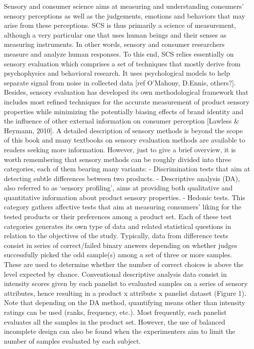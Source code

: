\documentclass[
]{book}
\begin{document}
Sensory and consumer science aims at measuring and understanding consumers' sensory perceptions as well as the judgements, emotions and behaviors that may arise from these perceptions. SCS is thus primarily a science of measurement, although a very particular one that uses human beings and their senses as measuring instruments. In other words, sensory and consumer researchers measure and analyze human responses.
To this end, SCS relies essentially on sensory evaluation which comprises a set of techniques that mostly derive from psychophysics and behavioral research. It uses psychological models to help separate signal from noise in collected data {[}ref O'Mahony, D.Ennis, others?{]}. Besides, sensory evaluation has developed its own methodological framework that includes most refined techniques for the accurate measurement of product sensory properties while minimizing the potentially biasing effects of brand identity and the influence of other external information on consumer perception {[}Lawless \& Heymann, 2010{]}.
A detailed description of sensory methods is beyond the scope of this book and many textbooks on sensory evaluation methods are available to readers seeking more information. However, just to give a brief overview, it is worth remembering that sensory methods can be roughly divided into three categories, each of them bearing many variants:
- Discrimination tests that aim at detecting subtle differences between two products.
- Descriptive analysis (DA), also referred to as `sensory profiling', aims at providing both qualitative and quantitative information about product sensory properties.
- Hedonic tests. This category gathers affective tests that aim at measuring consumers' liking for the tested products or their preferences among a product set.
Each of these test categories generates its own type of data and related statistical questions in relation to the objectives of the study. Typically, data from difference tests consist in series of correct/failed binary answers depending on whether judges successfully picked the odd sample(s) among a set of three or more samples. These are used to determine whether the number of correct choices is above the level expected by chance.
Conventional descriptive analysis data consist in intensity scores given by each panelist to evaluated samples on a series of sensory attributes, hence resulting in a product x attribute x panelist dataset (Figure 1). Note that depending on the DA method, quantifying means other than intensity ratings can be used (ranks, frequency, etc.). Most frequently, each panelist evaluates all the samples in the product set. However, the use of balanced incomplete design can also be found when the experimenters aim to limit the number of samples evaluated by each subject.
\end{document}
